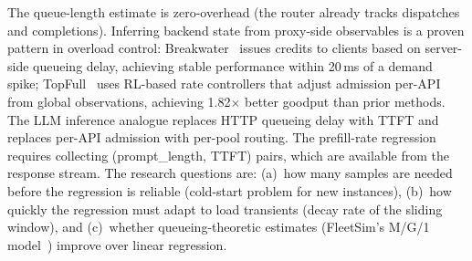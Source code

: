 \begin{opportunity}
\begin{frisk}
The queue-length estimate is zero-overhead (the router already
tracks dispatches and completions).  Inferring backend state from
proxy-side observables is a proven pattern in overload
control: Breakwater~\cite{cho2020breakwater} issues credits to
clients based on server-side queueing delay, achieving stable
performance within 20\,ms of a demand spike;
TopFull~\cite{topfull2024} uses RL-based rate controllers that
adjust admission per-API from global observations, achieving
1.82$\times$ better goodput than prior methods.  The LLM inference
analogue replaces HTTP queueing delay with TTFT and replaces
per-API admission with per-pool routing.  The prefill-rate
regression requires collecting (prompt\_length, TTFT) pairs, which
are available from the response stream.  The research questions
are: (a)~how many samples are needed before the regression is
reliable (cold-start problem for new instances), (b)~how quickly
the regression must adapt to load transients (decay rate of the
sliding window), and (c)~whether queueing-theoretic estimates
(FleetSim's M/G/1 model~\cite{fleetsim2026}) improve over
linear regression.
\end{frisk}
\end{opportunity}

